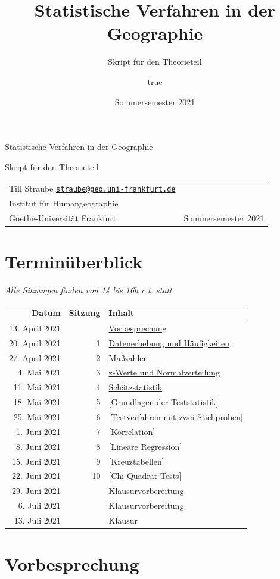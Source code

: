 \documentclass[
  11pt,
  ngerman,
  a4paper,
]{report}
\title{Statistische Verfahren in der Geographie}
\subtitle{Skript für den Theorieteil}
\author{true}
\date{Sommersemester 2021}
\makeatletter
\renewcommand{\maketitle}{
  \newpage
  \begingroup
    \setlength{\parindent}{0pt}
    \setlength{\parskip}{8pt}
    {\fontseries{b}\selectfont\Huge\raggedright{Statistische Verfahren in der Geographie}\par}
    {\fontseries{l}\LARGE\raggedright{Skript für den Theorieteil}\par}

    \vspace{1cm}
    
    \begin{tabularx}{\textwidth}{@{}X r}
                  Till Straube
        \newline \href{mailto:straube@geo.uni-frankfurt.de}{\nolinkurl{straube@geo.uni-frankfurt.de}}
                  \medskip\newline
          {\renewcommand\\{\newline}Institut für Humangeographie\\
Goethe-Universität Frankfurt}
         &
                    Sommersemester 2021
        \end{tabularx}
  \endgroup
  \vspace{1cm}
  \thispagestyle{plain}%
}
\makeatother
\begin{document}
\maketitle

{
\setcounter{tocdepth}{1}
\tableofcontents
}
\hypertarget{terminuxfcberblick}{%
\chapter*{Terminüberblick}\label{terminuxfcberblick}}

\emph{Alle Sitzungen finden von 14 bis 16h c.t. statt}

\begin{longtable}[]{@{}rrl@{}}
\toprule
Datum & Sitzung & Inhalt \\
\midrule
\endhead
13. April 2021 & & \protect\hyperlink{vorbesprechung}{Vorbesprechung} \\
20. April 2021 & 1 & \protect\hyperlink{datenerhebung-und-huxe4ufigkeiten}{Datenerhebung und Häufigkeiten} \\
27. April 2021 & 2 & \protect\hyperlink{mauxdfzahlen}{Maßzahlen} \\
4. Mai 2021 & 3 & \protect\hyperlink{z-werte-und-normalverteilung}{z-Werte und Normalverteilung} \\
11. Mai 2021 & 4 & \protect\hyperlink{schuxe4tzstatistik}{Schätzstatistik} \\
18. Mai 2021 & 5 & {[}Grundlagen der Teststatistik{]} \\
25. Mai 2021 & 6 & {[}Testverfahren mit zwei Stichproben{]} \\
1. Juni 2021 & 7 & {[}Korrelation{]} \\
8. Juni 2021 & 8 & {[}Lineare Regression{]} \\
15. Juni 2021 & 9 & {[}Kreuztabellen{]} \\
22. Juni 2021 & 10 & {[}Chi-Quadrat-Tests{]} \\
29. Juni 2021 & & Klausurvorbereitung \\
6. Juli 2021 & & Klausurvorbereitung \\
13. Juli 2021 & & Klausur \\
\bottomrule
\end{longtable}

\hypertarget{vorbesprechung}{%
\chapter*{Vorbesprechung}\label{vorbesprechung}}
\end{document}
